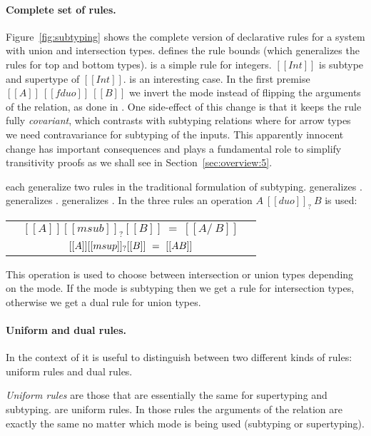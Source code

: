 \paragraph{Complete set of rules.}
Figure~\ref{fig:subtyping} shows the complete version of declarative \nameduo rules
for a system with union and intersection types.
 defines the rule bounds (which generalizes the rules for top and bottom types).
 is a simple rule for integers. $[[Int]]$ is subtype and supertype of $[[Int]]$.
 is an interesting case.
In the first premise  $[[A]] \ [[fduo]] \ [[B]]$ we invert the mode instead of flipping the arguments
of the relation, as done in . One side-effect of this change is that it keeps the
rule fully \emph{covariant}, which contrasts with subtyping relations where for arrow
types we need contravariance for subtyping of the inputs. This apparently innocent change has
important consequences and plays a fundamental role to simplify transitivity proofs as we shall
see in Section~\ref{sec:overview:5}.



 each generalize two rules in the
traditional formulation of subtyping.  generalizes .
 generalizes .   generalizes .
In the three rules an operation $A\ [[duo]]_? \ B$ is used:

\begin{center}
\begin{tabular}{rcl}
      & $[[A]] [[msub]]_? [[B]] \ = \ [[A /\ B]] $ \\
      & $[[A]] [[msup]]_? [[B]] \ = \ [[A \/ B]] $ \\
\end{tabular}
\end{center}

\noindent This operation is used to choose between intersection or union types depending
on the mode. If the \nameduo mode is subtyping then we get a rule for intersection types,
otherwise we get a dual rule for union types. 

\paragraph{Uniform and dual rules.}
In the context of \nameduo it is useful to distinguish between two different
kinds of rules: uniform rules and dual rules.


\emph{Uniform rules} are those that are essentially the same for
supertyping and subtyping.  are uniform
rules.  In those rules the arguments of the relation are exactly the
same no matter which mode is being used (subtyping or supertyping).


